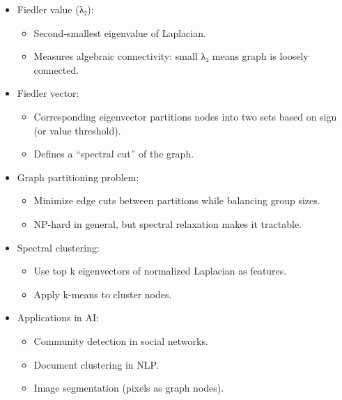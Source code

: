 \documentclass[
  letterpaper,
  DIV=11,
  numbers=noendperiod]{scrreprt}
\providecommand{\tightlist}{%
  \setlength{\itemsep}{0pt}\setlength{\parskip}{0pt}}
\begin{document}
\begin{itemize}
\item
  Fiedler value (λ₂):

  \begin{itemize}
  \tightlist
  \item
    Second-smallest eigenvalue of Laplacian.
  \item
    Measures algebraic connectivity: small λ₂ means graph is loosely
    connected.
  \end{itemize}
\item
  Fiedler vector:

  \begin{itemize}
  \tightlist
  \item
    Corresponding eigenvector partitions nodes into two sets based on
    sign (or value threshold).
  \item
    Defines a ``spectral cut'' of the graph.
  \end{itemize}
\item
  Graph partitioning problem:

  \begin{itemize}
  \tightlist
  \item
    Minimize edge cuts between partitions while balancing group sizes.
  \item
    NP-hard in general, but spectral relaxation makes it tractable.
  \end{itemize}
\item
  Spectral clustering:

  \begin{itemize}
  \tightlist
  \item
    Use top k eigenvectors of normalized Laplacian as features.
  \item
    Apply k-means to cluster nodes.
  \end{itemize}
\item
  Applications in AI:

  \begin{itemize}
  \tightlist
  \item
    Community detection in social networks.
  \item
    Document clustering in NLP.
  \item
    Image segmentation (pixels as graph nodes).
  \end{itemize}
\end{itemize}
\end{document}
